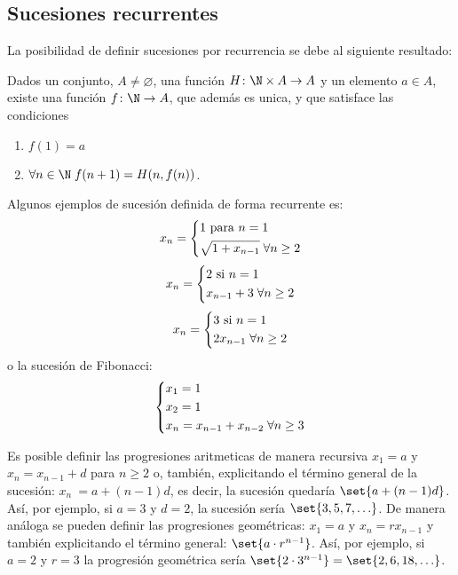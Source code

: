 \subsection{Sucesiones recurrentes}
La posibilidad de definir sucesiones por recurrencia se debe al siguiente resultado:
\begin{theorem}
	Dados un conjunto, \(A \neq \varnothing \), una función \(H \colon \N \times A \to A \) y un elemento \(a \in A \), existe una función \(f \colon \N \to A \), que además es unica, y que satisface las condiciones
	\begin{enumerate}
		\item \(f(1) = a \)
		\item \(\forall n \in \N \; f(n + 1) = H(n, f(n ))\).
	\end{enumerate}
\end{theorem}
\pagebreak
\begin{example}
	Algunos ejemplos de sucesión definida de forma recurrente es:
	\[
		x_n = \begin{dcases}
			1 \text{ para } n = 1 \\
			\sqrt{1 + x_{n-1}} \; \forall n \geq 2
		\end{dcases}
	\]
	\[
		x_n = \begin{dcases}
			2 \text{ si } n = 1 \\
			x_{n-1} + 3 \; \forall n \geq 2
		\end{dcases}
	\]
	\[
		x_n = \begin{dcases}
			3 \text{ si } n = 1 \\
			2 x_{n-1} \; \forall n \geq 2
		\end{dcases}
	\]
	o la sucesión de Fibonacci:
	\[
		\begin{dcases}
			x_1 = 1 \\
			x_2 = 1 \\
			x_n = x_{n-1} + x_{n-2} \; \forall n \geq 3
		\end{dcases}
	\]
\end{example}
Es posible definir las progresiones aritmeticas de manera recursiva \(x_1 = a \) y \(x_n = x_{n-1} + d \) para \(n \geq  2 \) o, también, explicitando el término general de la sucesión: \(x_n\ = a + (n-1)d\), es decir, la sucesión quedaría \(\set{a + (n-1)d }\). Así, por ejemplo, si \(a = 3 \) y \(d = 2 \), la sucesión sería \(\set{3,5,7,\ldots }\). De manera análoga se pueden definir las progresiones geométricas: \(x_1 = a \) y \(x_n = rx_{n-1}\) y también explicitando el término general: \(\set{a \cdot r^{n-1 } }\). Así, por ejemplo, si \(a = 2 \) y \(r = 3 \) la progresión geométrica sería \(\set{2 \cdot 3^{n-1} } = \set{2,6,18,\ldots}\).


